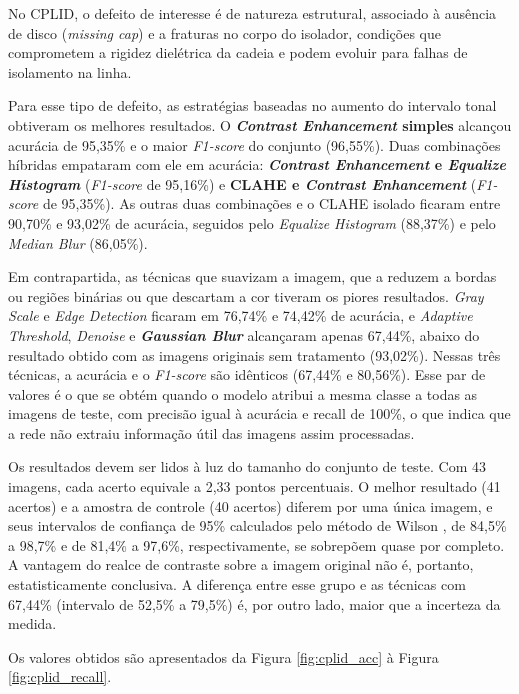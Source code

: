 No CPLID, o defeito de interesse é de natureza estrutural, associado à ausência de disco (\textit{missing cap}) e a fraturas no corpo do isolador, condições que comprometem a rigidez dielétrica da cadeia e podem evoluir para falhas de isolamento na linha.

Para esse tipo de defeito, as estratégias baseadas no aumento do intervalo tonal obtiveram os melhores resultados. O \textbf{\textit{Contrast Enhancement} simples} alcançou acurácia de 95,35\% e o maior \textit{F1-score} do conjunto (96,55\%). Duas combinações híbridas empataram com ele em acurácia: \textbf{\textit{Contrast Enhancement} e \textit{Equalize Histogram}} (\textit{F1-score} de 95,16\%) e \textbf{CLAHE e \textit{Contrast Enhancement}} (\textit{F1-score} de 95,35\%). As outras duas combinações e o CLAHE isolado ficaram entre 90,70\% e 93,02\% de acurácia, seguidos pelo \textit{Equalize Histogram} (88,37\%) e pelo \textit{Median Blur} (86,05\%).

Em contrapartida, as técnicas que suavizam a imagem, que a reduzem a bordas ou regiões binárias ou que descartam a cor tiveram os piores resultados. \textit{Gray Scale} e \textit{Edge Detection} ficaram em 76,74\% e 74,42\% de acurácia, e \textit{Adaptive Threshold}, \textit{Denoise} e \textbf{\textit{Gaussian Blur}} alcançaram apenas 67,44\%, abaixo do resultado obtido com as imagens originais sem tratamento (93,02\%). Nessas três técnicas, a acurácia e o \textit{F1-score} são idênticos (67,44\% e 80,56\%). Esse par de valores é o que se obtém quando o modelo atribui a mesma classe a todas as imagens de teste, com precisão igual à acurácia e recall de 100\%, o que indica que a rede não extraiu informação útil das imagens assim processadas.

Os resultados devem ser lidos à luz do tamanho do conjunto de teste. Com 43 imagens, cada acerto equivale a 2,33 pontos percentuais. O melhor resultado (41 acertos) e a amostra de controle (40 acertos) diferem por uma única imagem, e seus intervalos de confiança de 95\% calculados pelo método de Wilson \cite{wilson1927probable}, de 84,5\% a 98,7\% e de 81,4\% a 97,6\%, respectivamente, se sobrepõem quase por completo. A vantagem do realce de contraste sobre a imagem original não é, portanto, estatisticamente conclusiva. A diferença entre esse grupo e as técnicas com 67,44\% (intervalo de 52,5\% a 79,5\%) é, por outro lado, maior que a incerteza da medida.

Os valores obtidos são apresentados da Figura \ref{fig:cplid_acc} à Figura \ref{fig:cplid_recall}.

